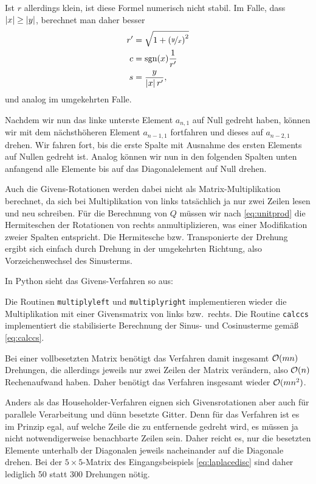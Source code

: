 Ist $r$ allerdings klein, ist diese Formel numerisch nicht stabil. Im
Falle, dass $\left\lvert{x}\right\rvert\ge\left\lvert{y}\right\rvert$, berechnet man daher besser
\begin{align}
  \label{eq:calccs}
  r'&=\sqrt{1 + \left(\nicefrac{y}{x}\right)^2}\nonumber\\
  c &=\text{sgn}(x)\frac{1}{r'}\\
  s &= \frac{y}{\left\lvert{x}\right\rvert r'}\nonumber,
\end{align}
und analog im
umgekehrten Falle.

Nachdem wir nun das linke unterste Element $a_{n,1}$ auf Null gedreht
haben, können wir mit dem nächsthöheren Element $a_{n-1,1}$ fortfahren
und dieses auf $a_{n-2,1}$ drehen. Wir fahren fort, bis die erste
Spalte mit Ausnahme des ersten Elements auf Nullen gedreht ist. Analog
können wir nun in den folgenden Spalten unten anfangend alle Elemente
bis auf das Diagonalelement auf Null drehen.

Auch die Givens-Rotationen werden dabei nicht als
Matrix-Multiplikation berechnet, da sich bei Multiplikation von links
tatsächlich ja nur zwei Zeilen lesen und neu schreiben. Für die
Berechnung von $Q$ müssen wir nach \eqref{eq:unitprod} die Hermiteschen der
Rotationen von rechts anmultiplizieren, was einer Modifikation zweier
Spalten entspricht. Die Hermitesche bzw. Transponierte der Drehung
ergibt sich einfach durch Drehung in der umgekehrten Richtung, also
Vorzeichenwechsel des Sinusterms.

\clearpage

In Python sieht das Givens-Verfahren so aus:

Die Routinen \lstinline!multiplyleft! und \lstinline!multiplyright!
implementieren wieder die Multiplikation mit einer Givensmatrix von
links bzw.\ rechts. Die Routine \lstinline!calccs! implementiert die
stabilisierte Berechnung der Sinus- und Cosinusterme gemäß \eqref{eq:calccs}.

Bei einer vollbesetzten Matrix benötigt das Verfahren damit insgesamt
$\mathcal O(mn)$ Drehungen, die allerdings jeweils nur zwei Zeilen der Matrix
verändern, also $\mathcal O(n)$ Rechenaufwand haben. Daher benötigt das
Verfahren insgesamt wieder $\mathcal O(mn^2)$.

Anders als das Householder-Verfahren eignen sich Givensrotationen aber
auch für parallele Verarbeitung und dünn besetzte Gitter. Denn für das
Verfahren ist es im Prinzip egal, auf welche Zeile die zu entfernende
gedreht wird, es müssen ja nicht notwendigerweise benachbarte Zeilen
sein. Daher reicht es, nur die besetzten Elemente unterhalb der
Diagonalen jeweils nacheinander auf die Diagonale drehen. Bei der
$5\times 5$-Matrix des Eingangsbeispiels \eqref{eq:laplacedisc} sind
daher lediglich 50 statt 300 Drehungen nötig.


